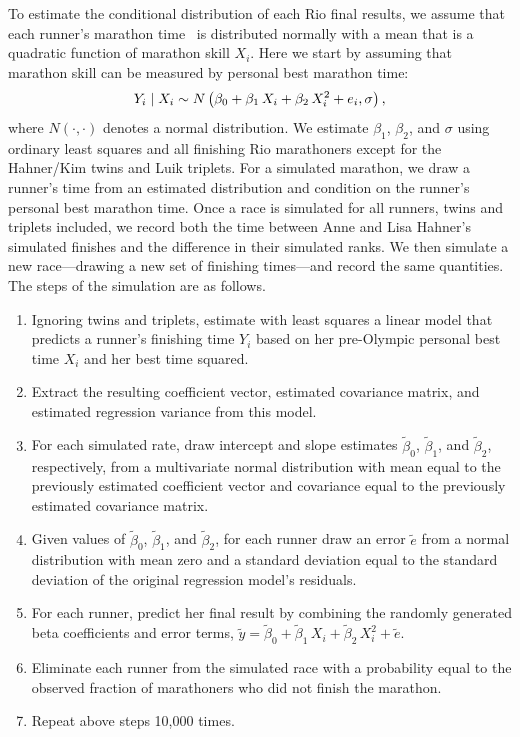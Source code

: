 \documentclass[12pt,titlepage]{article}
\begin{document}
To estimate the conditional distribution of each Rio final results, we
assume that each runner's marathon time \Yi\ is distributed normally
with a mean that is a quadratic function of marathon skill $X_i$. Here
we start by assuming that marathon skill can be measured by personal
best marathon time:
$$Y_i \mid X_i \sim N\left(\beta_0 + \beta_1\,X_{i} + \beta_2\,X^2_{i}  + e_i, \sigma\right),$$
where $N\left(\cdot,\cdot\right)$ denotes a normal distribution.  We
estimate $\beta_1$, $\beta_2$, and $\sigma$ using ordinary least
squares and all finishing Rio marathoners except for the Hahner/Kim
twins and Luik triplets.  For a simulated marathon, we draw a runner's
time from an estimated distribution and condition on the runner's
personal best marathon time.  Once a race is simulated for all
runners, twins and triplets included, we record both the time between
Anne and Lisa Hahner's simulated finishes and the difference in their
simulated ranks.  We then simulate a new race---drawing a new set of
finishing times---and record the same quantities. The steps of the
simulation are as follows.
\begin{enumerate}
\item Ignoring twins and triplets, estimate with least squares a
  linear model that predicts a runner's finishing time $Y_i$ based on
  her pre-Olympic personal best time $X_i$ and her best time squared.
\item Extract the resulting coefficient vector, estimated covariance
  matrix, and estimated regression variance from this model.
\item For each simulated rate, draw intercept and slope estimates
  $\tilde{\beta}_0$, $\tilde{\beta}_1$, and $\tilde{\beta}_2$,
  respectively, from a multivariate normal distribution with mean
  equal to the previously estimated coefficient vector and covariance
  equal to the previously estimated covariance matrix.
\item Given values of $\tilde{\beta}_0$, $\tilde{\beta}_1$, and
  $\tilde{\beta}_2$, for each runner draw an error $\tilde{e}$ from a
  normal distribution with mean zero and a standard deviation equal to
  the standard deviation of the original regression model's residuals.
\item For each runner, predict her final result by combining the
  randomly generated beta coefficients and error terms,
  $\tilde{y} = \tilde{\beta}_0 + \tilde{\beta}_1\,X_i +
  \tilde{\beta}_2\,X_i^2 + \tilde{e}$.
\item Eliminate each runner from the simulated race with a probability
  equal to the observed fraction of marathoners who did not finish the
  marathon.
\item Repeat above steps 10,000 times.
\end{enumerate}
\end{document}
